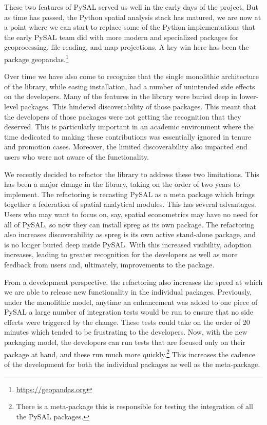\documentclass[11pt]{article}
\begin{document}
These two features of PySAL served us well in the early days of the project.
But as time has passed, the Python spatial analysis stack has matured, we are
now at a point where we can start to replace some of the Python implementations
that the early PySAL team did with more modern and specialized packages for
geoprocessing, file reading, and map projections. A key win here has been the
package geopandas.\footnote{\url{https://geopandas.org}}


Over time we have also come to recognize that the single monolithic
architecture of the library, while easing installation, had a number of
unintended side effects on the developers. Many of the features in the library
were buried deep in lower-level packages. This hindered discoverability of
those packages. This meant that the developers of those packages were not
getting the recognition that they deserved. This is particularly important in an
academic environment where the time dedicated to making these contributions was
essentially ignored in tenure and promotion cases. Moreover, the limited
discoverability also impacted end users who were not aware of the
functionality.


We recently decided to refactor the library to address these two limitations.
This has been a major change in the library, taking on the order of two years
to implement. The refactoring is recasting PySAL as a meta package which brings
together a federation of spatial analytical modules. This has several
advantages. Users who may want to focus on, say, spatial econometrics
may have no need for all of PySAL, so now they can install spreg as its own
package. The refactoring also increases discoverability as spreg is its own
active stand-alone package, and is no longer buried deep inside PySAL. With
this increased visibility, adoption increases, leading to greater recognition
for the developers as well as more feedback from users and, ultimately,
improvements to the package.

From a development perspective, the refactoring also increases the speed at
which we are able to release new functionality in the individual packages.
Previously, under the monolithic model, anytime an enhancement was
added to one piece of PySAL a large number of integration tests would be run to
ensure that no side effects were triggered by the change. These tests could
take on the order of 20 minutes which tended to be frustrating
to the developers. Now, with the new packaging model, the developers can run
 tests that are focused only on their package at hand, and these run much more
quickly.\footnote{There is a meta-package this is responsible for testing the
integration of all the PySAL packages.} This increases the cadence of the development for both
the individual packages as well as the meta-package.
\end{document}
